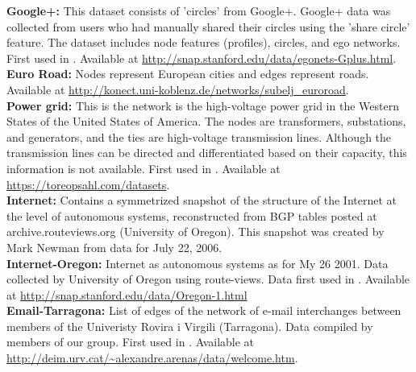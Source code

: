\documentclass{article}
\begin{document}
\textbf{Google+:} This dataset consists of 'circles' from Google+. Google+ data was collected from users who had manually shared their circles using the 'share circle' feature. The dataset includes node features (profiles), circles, and ego networks. First used in \cite{Leskovec2012LearningNetworks}. Available at \url{http://snap.stanford.edu/data/egonets-Gplus.html}.
\\

\textbf{Euro Road:} Nodes represent European cities and edges represent roads. Available at \url{http://konect.uni-koblenz.de/networks/subelj_euroroad}.
\\

\textbf{Power grid:} This is the network is the high-voltage power grid in the Western States of the United States of America. The nodes are transformers, substations, and generators, and the ties are high-voltage transmission lines. Although the transmission lines can be directed and differentiated based on their capacity, this information is not available. First used in \cite{Watts1998}. Available at \url{https://toreopsahl.com/datasets}.
\\

\textbf{Internet:} Contains a symmetrized snapshot of the structure
of the Internet at the level of autonomous systems, reconstructed from BGP
tables posted at archive.routeviews.org (University of Oregon).  This snapshot was created by Mark
Newman from data for July 22, 2006.
\\

\textbf{Internet-Oregon:} Internet as autonomous systems as for My 26 2001. Data collected by University of Oregon using route-views. Data first used in \cite{Leskovec2005GraphsExplanations}. Available at \url{http://snap.stanford.edu/data/Oregon-1.html} \\


\textbf{Email-Tarragona:} List of edges of the network of e-mail interchanges between members of the Univeristy Rovira i Virgili (Tarragona). Data compiled by members of our group. First used in \cite{Guimera2003Self-similarInteractions}. Available at \url{http://deim.urv.cat/~alexandre.arenas/data/welcome.htm}.
\\
\end{document}
